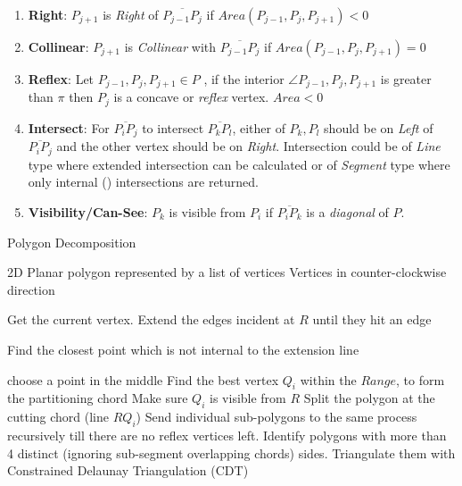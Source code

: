 \begin{enumerate}
\item {\bf Right}: $P_{j+1}$ is {\em Right} of $ \overline{P_{j-1} P_j}$ if $Area( P_{j-1}, P_j,  P_{j+1}) < 0$ 

\item {\bf Collinear}: $P_{j+1}$ is {\em Collinear} with $ \overline{P_{j-1} P_j}$ if $Area( P_{j-1}, P_j,  P_{j+1}) = 0$ 

\item {\bf Reflex}: Let  $ P_{j-1}, P_j,  P_{j+1} \in P $ , if the interior $\angle P_{j-1}, P_j,  P_{j+1}$ is greater than $\pi$  then $P_j$  is a concave or {\em reflex} vertex. $Area < 0$

\item {\bf Intersect}: For  $\overline{P_i P_j}$ to intersect $\overline{P_k P_l}$, either of $P_k, P_l$ should be on {\em Left} of  $\overline{P_i P_j}$ and the other vertex should be on {\em Right}. Intersection could be of {\em Line} type where extended intersection can be calculated or of {\em Segment} type where only internal () intersections are returned.

\item {\bf Visibility/Can-See}: $P_k$ is visible from $P_i$ if $\overline{P_i P_k}$ is a {\em diagonal} of $P$. 

\end{enumerate}

\begin{algorithm}
	\caption{Polygon Decomposition}
	\label{alg1}
	\begin{algorithmic}
		\REQUIRE 2D Planar polygon represented by a list of vertices
		\ENSURE Vertices in counter-clockwise direction

			\STATE Get the current vertex.
				\STATE Extend  the  edges incident at $R$ until they hit an edge

					\STATE Find the closest point which is not internal to the extension line
				\ENDIF

					\STATE choose a point in the middle
				\ELSE
					\STATE Find the best vertex $Q_i$ within the $Range$, to form the partitioning chord
					\STATE Make sure $Q_i$ is visible from $R$
				\ENDIF
			\ENDIF
		\ENDWHILE
		\STATE  Split the polygon at the cutting chord (line $RQ_i$)
		\STATE Send individual sub-polygons to the same process recursively till there are no reflex vertices left. 
		\STATE  Identify polygons with more than 4 distinct (ignoring sub-segment overlapping chords) sides. Triangulate them with Constrained Delaunay Triangulation (CDT)
	\end{algorithmic}
\end{algorithm}

